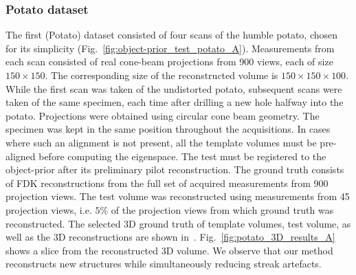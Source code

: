 \documentclass[journal]{IEEEtran}
\begin{document}

\subsubsection{\textbf{Potato dataset}}
\label{Sec:potato}
The first (Potato) dataset consisted of four scans of the humble potato, chosen for its simplicity (Fig.~\ref{fig:object-prior_test_potato_A}). Measurements from each scan consisted of real cone-beam projections from 900 views, each of size $150\times150$. The corresponding size of the reconstructed volume is $150\times150\times100$. While the first scan was taken of the undistorted potato, subsequent scans were taken of the same specimen, each time after drilling a new hole halfway into the potato.  Projections were obtained using circular cone beam geometry. The specimen was kept in the same position throughout the acquisitions. In cases where such an alignment is not present, all the template volumes must be pre-aligned before computing the eigenspace. The test must be registered to the object-prior after its preliminary pilot reconstruction. %
 The ground truth consists of FDK reconstructions from the full set of acquired measurements from 900 projection views. The test volume was reconstructed using measurements from 45 projection views, i.e. $5\%$ of the projection views from which ground truth was reconstructed.  The selected 3D
ground truth of template volumes, test volume, as well as the 3D reconstructions are shown in~\cite{supp_paper}. Fig.~\ref{fig:potato_3D_results_A} shows a slice from the reconstructed 3D volume. We observe that our method reconstructs new structures while simultaneously reducing streak artefacts.\\ %
\end{document}
